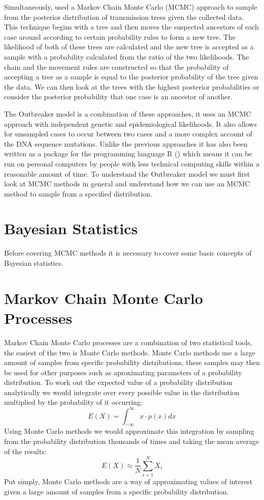 \documentclass[11pt,a4paper]{report}
\begin{document}
Simultaneously, \citet{Morelli12} used a Markov Chain Monte Carlo (MCMC) approach to sample from the posterior distribution of transmission trees given the collected data. This technique begins with a tree and then moves the suspected ancestors of each case around according to certain probability rules to form a new tree. The likelihood of both of these trees are calculated and the new tree is accepted as a sample with a probability calculated from the ratio of the two likelihoods. The chain and the movement rules are constructed so that the probability of accepting a tree as a sample is equal to the posterior probability of the tree given the data. We can then look at the trees with the highest posterior probabilities or consider the posterior probability that one case is an ancestor of another.

The Outbreaker model is a combination of these approaches, it uses an MCMC approach with independent genetic and epidemiological likelihoods. It also allows for unsampled cases to occur between two cases and a more complex account of the DNA sequence mutations. Unlike the previous approaches it has also been written as a package for the programming language R (\citet{R14}) which means it can be run on personal computers by people with less technical computing skills within a reasonable amount of time. To understand the Outbreaker model we must first look at MCMC methods in general and understand how we can use an MCMC method to sample from a specified distribution.

\section{Bayesian Statistics}
Before covering MCMC methods it is necessary to cover some basic concepts of Bayesian statistics.


\section{Markov Chain Monte Carlo Processes}
Markov Chain Monte Carlo processes are a combination of two statistical tools, the easiest of the two is Monte Carlo methods. Monte Carlo methods use a large amount of samples from specific probability distributions, these samples may then be used for other purposes such as aproximating parameters of a probability distribution. To work out the expected value of a probability distribution analytically we would integrate over every possible value in the distribution multiplied by the probability of it occurring:
\begin{equation}
E(X) = \int_{-\infty}^{\infty} x \cdot p(x) dx
\end{equation}
Using Monte Carlo methods we would approximate this integration by sampling from the probability distribution thousands of times and taking the mean average of the results:
\begin{equation}
E(X) \approx \frac{1}{N}\sum_{i=1}^{N} X_i 
\end{equation}
Put simply, Monte Carlo methods are a way of approximating values of interest given a large amount of samples from a specific probability distribution.
\end{document}
